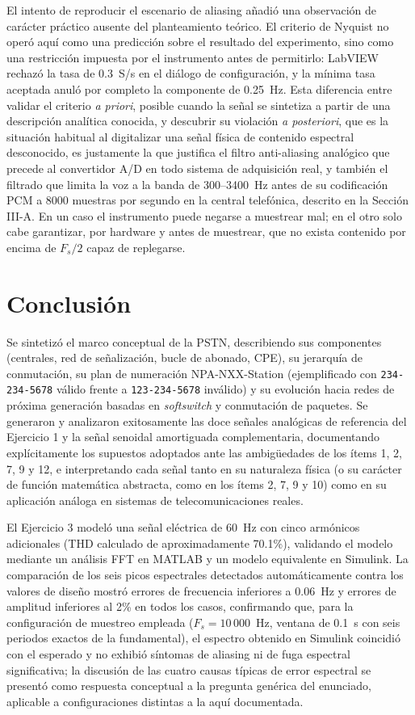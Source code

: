 \documentclass[conference]{IEEEtran}
\begin{document}
El intento de reproducir el escenario de aliasing añadió una observación de carácter práctico ausente del planteamiento teórico. El criterio de Nyquist no operó aquí como una predicción sobre el resultado del experimento, sino como una restricción impuesta por el instrumento antes de permitirlo: LabVIEW rechazó la tasa de 0.3~S/s en el diálogo de configuración, y la mínima tasa aceptada anuló por completo la componente de 0.25~Hz. Esta diferencia entre validar el criterio \emph{a priori}, posible cuando la señal se sintetiza a partir de una descripción analítica conocida, y descubrir su violación \emph{a posteriori}, que es la situación habitual al digitalizar una señal física de contenido espectral desconocido, es justamente la que justifica el filtro anti-aliasing analógico que precede al convertidor A/D en todo sistema de adquisición real, y también el filtrado que limita la voz a la banda de 300--3400~Hz antes de su codificación PCM a 8000 muestras por segundo en la central telefónica, descrito en la Sección III-A. En un caso el instrumento puede negarse a muestrear mal; en el otro solo cabe garantizar, por hardware y antes de muestrear, que no exista contenido por encima de $F_s/2$ capaz de replegarse.

\section{Conclusión}

Se sintetizó el marco conceptual de la PSTN, describiendo sus componentes (centrales, red de señalización, bucle de abonado, CPE), su jerarquía de conmutación, su plan de numeración NPA-NXX-Station (ejemplificado con \texttt{234-234-5678} válido frente a \texttt{123-234-5678} inválido) y su evolución hacia redes de próxima generación basadas en \textit{softswitch} y conmutación de paquetes. Se generaron y analizaron exitosamente las doce señales analógicas de referencia del Ejercicio 1 y la señal senoidal amortiguada complementaria, documentando explícitamente los supuestos adoptados ante las ambigüedades de los ítems 1, 2, 7, 9 y 12, e interpretando cada señal tanto en su naturaleza física (o su carácter de función matemática abstracta, como en los ítems 2, 7, 9 y 10) como en su aplicación análoga en sistemas de telecomunicaciones reales.

El Ejercicio 3 modeló una señal eléctrica de 60~Hz con cinco armónicos adicionales (THD calculado de aproximadamente 70.1\%), validando el modelo mediante un análisis FFT en MATLAB y un modelo equivalente en Simulink. La comparación de los seis picos espectrales detectados automáticamente contra los valores de diseño mostró errores de frecuencia inferiores a 0.06~Hz y errores de amplitud inferiores al 2\% en todos los casos, confirmando que, para la configuración de muestreo empleada ($F_s=10\,000$~Hz, ventana de 0.1~s con seis periodos exactos de la fundamental), el espectro obtenido en Simulink coincidió con el esperado y no exhibió síntomas de aliasing ni de fuga espectral significativa; la discusión de las cuatro causas típicas de error espectral se presentó como respuesta conceptual a la pregunta genérica del enunciado, aplicable a configuraciones distintas a la aquí documentada.
\end{document}
